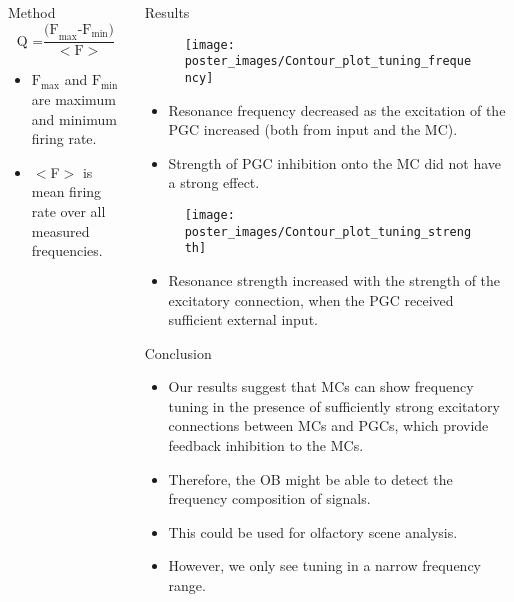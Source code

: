 \documentclass[final,hyperref={pdfpagelabels=false}]{beamer}
\begin{document}
\begin{frame}{}
\begin{columns}[t]
\begin{column}{.48\linewidth}
\begin{block}{Method}
\[
\text{Q =} \frac{\text{(F}_{\text{max}} \text{-F}_{\text{min}}\text{)}}{<\text{F}>}
\]
\begin{itemize}
\item \mbox{$\text{F}_{\text{max}}$} and \mbox{$\text{F}_{\text{min}}$} are maximum and minimum firing rate.
\item $<$F$>$ is mean firing rate over all measured frequencies.
\end{itemize}
\end{block}

\end{column}
\begin{column}{.48\linewidth}

\begin{block}{Results}
\begin{figure}
\centering
\texttt{[image: poster\_images/Contour\_plot\_tuning\_frequency]}
\end{figure}
\begin{itemize}
\item Resonance frequency decreased as the excitation of the PGC increased (both from input and the MC).
\item Strength of PGC inhibition onto the MC did not have a strong effect.
\end{itemize}
\begin{figure}
\centering
\texttt{[image: poster\_images/Contour\_plot\_tuning\_strength]}
\end{figure} 
\begin{itemize}
\item Resonance strength increased with the strength of the excitatory connection, when the PGC received sufficient external input.
\end{itemize}
\end{block}

\begin{block}{Conclusion}
\begin{itemize}
\item Our results suggest that MCs can show frequency tuning in the presence of sufficiently strong excitatory connections between MCs and PGCs, which provide feedback inhibition to the MCs.
\item Therefore, the OB might be able to detect the frequency composition of signals.
\item This could be used for olfactory scene analysis.
\item However, we only see tuning in a narrow frequency range.
\end{itemize}
\end{block}


\end{column}
\end{columns}
\end{frame}
\end{document}
